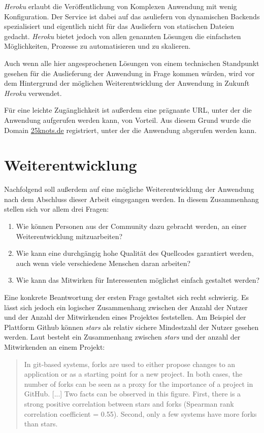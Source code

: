 \textit{Heroku} erlaubt die Veröffentlichung von Komplexen Anwendung mit wenig Konfiguration. Der Service ist dabei auf das asuliefern von dynamischen Backends spezialisiert und eigentlich nicht für das Ausliefern von statischen Dateien gedacht. \textit{Heroku} bietet jedoch von allen genannten Lösungen die einfachsten Möglichkeiten, Prozesse zu automatisieren und zu skalieren.

Auch wenn alle hier angesprochenen Lösungen von einem technischen Standpunkt gesehen für die Auslieferung der Anwendung in Frage kommen würden, wird vor dem Hintergrund der möglichen Weiterentwicklung der Anwendung in Zukunft \textit{Heroku} verwendet.

Für eine leichte Zugänglichkeit ist außerdem eine prägnante URL, unter der die Anwendung aufgerufen werden kann, von Vorteil. Aus diesem Grund wurde die Domain \url{25knots.de} registriert, unter der die Anwendung abgerufen werden kann.

\section{Weiterentwicklung}
Nachfolgend soll außerdem auf eine mögliche Weiterentwicklung der Anwendung nach dem Abschluss dieser Arbeit eingegangen werden. In diesem Zusammenhang stellen sich vor allem drei Fragen:
\begin{enumerate}
  \item Wie können Personen aus der Community dazu gebracht werden, an einer Weiterentwicklung mitzuarbeiten?
  \item Wie kann eine durchgängig hohe Qualität des Quellcodes garantiert werden, auch wenn viele verschiedene Menschen daran arbeiten?
  \item Wie kann das Mitwirken für Interessenten möglichst einfach gestaltet werden?
\end{enumerate}

Eine konkrete Beantwortung der ersten Frage gestaltet sich recht schwierig. Es lässt sich jedoch ein logischer Zusammenhang zwischen der Anzahl der Nutzer und der Anzahl der Mitwirkenden eines Projektes feststellen. Am Beispiel der Plattform Github können \textit{stars} als relativ sichere Mindestzahl der Nutzer gesehen werden. Laut \cite{borges2015popularity} besteht ein Zusammenhang zwischen \textit{stars} und der anzahl der Mitwirkenden an einem Projekt:

\begin{quote}
  In git-based systems, forks are used to either propose changes to an application or as
a starting point for a new project. In both cases, the number of forks can be seen as a proxy
for the importance of a project in GitHub. [...] Two facts can be observed in this figure. First, there is a strong positive
correlation between stars and forks (Spearman rank correlation coefficient = 0.55). Second,
only a few systems have more forks than stars.
\end{quote}

